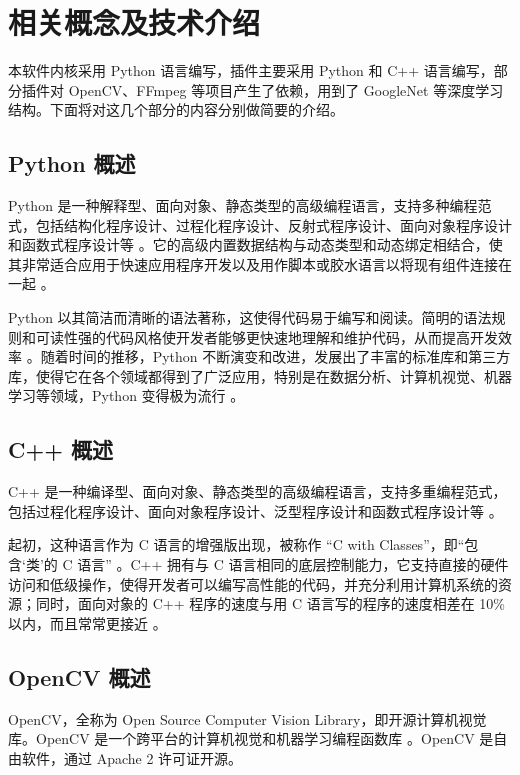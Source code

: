 \chapter{相关概念及技术介绍}

本软件内核采用 Python 语言编写，插件主要采用 Python 和 C++ 语言编写，部分插件对 OpenCV、FFmpeg 等项目产生了依赖，用到了 GoogleNet 等深度学习结构。下面将对这几个部分的内容分别做简要的介绍。

\section{Python 概述}

Python 是一种解释型、面向对象、静态类型的高级编程语言，支持多种编程范式，包括结构化程序设计、过程化程序设计、反射式程序设计、面向对象程序设计和函数式程序设计等 \cite{wiki_py}。它的高级内置数据结构与动态类型和动态绑定相结合，使其非常适合应用于快速应用程序开发以及用作脚本或胶水语言以将现有组件连接在一起 \cite{whats_py}。

Python 以其简洁而清晰的语法著称，这使得代码易于编写和阅读。简明的语法规则和可读性强的代码风格使开发者能够更快速地理解和维护代码，从而提高开发效率 \cite{about_py}。随着时间的推移，Python 不断演变和改进，发展出了丰富的标准库和第三方库，使得它在各个领域都得到了广泛应用，特别是在数据分析、计算机视觉、机器学习等领域，Python 变得极为流行 \cite{pep206}。

\section{C++ 概述}

C++ 是一种编译型、面向对象、静态类型的高级编程语言，支持多重编程范式，包括过程化程序设计、面向对象程序设计、泛型程序设计和函数式程序设计等 \cite{wiki_c}。

起初，这种语言作为 C 语言的增强版出现，被称作 “C with Classes”，即“包含‘类’的 C 语言” \cite{bs_c}。C++ 拥有与 C 语言相同的底层控制能力，它支持直接的硬件访问和低级操作，使得开发者可以编写高性能的代码，并充分利用计算机系统的资源；同时，面向对象的 C++ 程序的速度与用 C 语言写的程序的速度相差在 10\% 以内，而且常常更接近 \cite{t_c}。

\section{OpenCV 概述}

OpenCV，全称为 Open Source Computer Vision Library，即开源计算机视觉库。OpenCV 是一个跨平台的计算机视觉和机器学习编程函数库 \cite{rcv}。OpenCV 是自由软件，通过 Apache 2 许可证开源。

